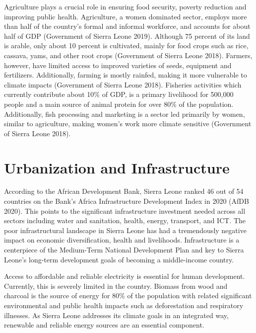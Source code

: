 \documentclass[
]{book}
\begin{document}
Agriculture plays a crucial role in ensuring food security, poverty reduction and improving public health. Agriculture, a women dominated sector, employs more than half of the country's formal and informal workforce, and accounts for about half of GDP (Government of Sierra Leone 2019). Although 75 percent of its land is arable, only about 10 percent is cultivated, mainly for food crops such as rice, cassava, yams, and other root crops (Government of Sierra Leone 2018). Farmers, however, have limited access to improved varieties of seeds, equipment and fertilizers. Additionally, farming is mostly rainfed, making it more vulnerable to climate impacts (Government of Sierra Leone 2018). Fisheries activities which currently contribute about 10\% of GDP, is a primary livelihood for 500,000 people and a main source of animal protein for over 80\% of the population. Additionally, fish processing and marketing is a sector led primarily by women, similar to agriculture, making women's work more climate sensitive (Government of Sierra Leone 2018).

\hypertarget{urbanization-and-infrastructure}{%
\section{Urbanization and Infrastructure}\label{urbanization-and-infrastructure}}

According to the African Development Bank, Sierra Leone ranked 46 out of 54 countries on the Bank's Africa Infrastructure Development Index in 2020 (AfDB 2020). This points to the significant infrastructure investment needed across all sectors including water and sanitation, health, energy, transport, and ICT. The poor infrastructural landscape in Sierra Leone has had a tremendously negative impact on economic diversification, health and livelihoods. Infrastructure is a centerpiece of the Medium-Term National Development Plan and key to Sierra Leone's long-term development goals of becoming a middle-income country.

Access to affordable and reliable electricity is essential for human development. Currently, this is severely limited in the country. Biomass from wood and charcoal is the source of energy for 80\% of the population with related significant environmental and public health impacts such as deforestation and respiratory illnesses. As Sierra Leone addresses its climate goals in an integrated way, renewable and reliable energy sources are an essential component.
\end{document}
